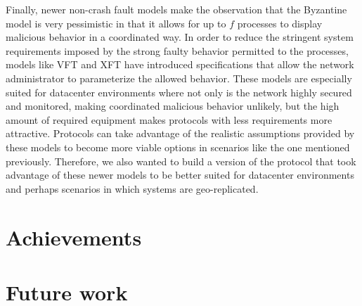 Finally, newer non-crash fault models make the observation that the Byzantine model is very pessimistic in that it allows for up to $f$ processes to display malicious behavior in a coordinated way. In order to reduce the stringent system requirements imposed by the strong faulty behavior permitted to the processes, models like VFT and XFT have introduced specifications that allow the network administrator to parameterize the allowed behavior. These models are especially suited for datacenter environments where not only is the network highly secured and monitored, making coordinated malicious behavior unlikely, but the high amount of required equipment makes protocols with less requirements more attractive. Protocols can take advantage of the realistic assumptions provided by these models to become more viable options in scenarios like the one mentioned previously. Therefore, we also wanted to build a version of the protocol that took advantage of these newer models to be better suited for datacenter environments and perhaps scenarios in which systems are geo-replicated. \par

\section{Achievements}


\section{Future work}
